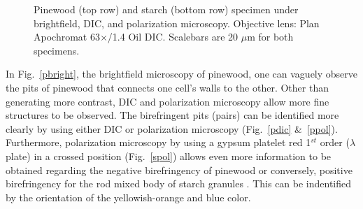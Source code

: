 \begin{figure}[ht]
 \hspace{0.1mm}
\caption[Left: brightfield, middle: dic, right: polar.]{Pinewood (top row) and starch (bottom row) specimen under brightfield, DIC, and polarization microscopy. 
Objective lens: Plan Apochromat 63$\times$/1.4 Oil DIC. 
Scalebars are 20 $\mu$m for both specimens.} 
\label{fig:pinestar}
\end{figure}

In Fig.~\ref{pbright}, the brightfield microscopy of pinewood, one can vaguely observe the pits of pinewood that connects one cell's walls to the other. 
Other than generating more contrast, DIC and polarization microscopy allow more fine structures to be observed. 
The birefringent pits (pairs) can be identified more clearly by using either DIC or polarization microscopy (Fig.~\ref{pdic} \&~\ref{ppol}). 
Furthermore, polarization microscopy by using a gypsum platelet red 1$^{st}$ order ($\lambda$ plate) in a crossed position (Fig.~\ref{spol}) allows even more information to be obtained regarding the negative birefringency of pinewood or conversely, positive birefringency for the rod mixed body of starch granules \cite{Lect08}. 
This can be indentified by the orientation of the yellowish-orange and blue color.



